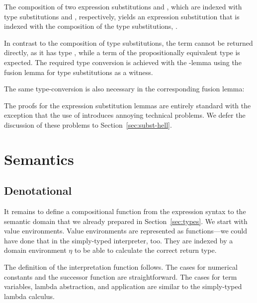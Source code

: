 \documentclass[acmsmall,anonymous,review,screen]{acmart}
\begin{document}

The composition of two expression substitutions  and , which
are indexed with type substitutions  and
, respectively, yields an expression substitution that
is indexed with the composition of the type substitutions,
.
\SubstExamplesECompSS

In contrast to the composition of type substitutions, the term
 cannot be returned directly,
as it has type ,
while a term of the propositionally equivalent type
 is expected.
The required type conversion is achieved with the {\Asubst}-lemma
using the fusion lemma for type substitutions as a witness.

The same type-conversion is also necessary in the corresponding fusion lemma:
\SubstExamplesFusionESubESub

The proofs for the expression substitution lemmas are entirely standard with the
exception that the use of {\Asubst} introduces annoying technical problems.
We defer the discussion of these problems to Section~\ref{sec:subst-hell}.


\section{Semantics}
\label{sec:semantics}

\subsection{Denotational}
\label{sec:denotational}



It remains to define a compositional function from the expression
syntax to the semantic domain that we already prepared in
Section~\ref{sec:types}. We start with value environments.
\TFVEnv
Value environments are represented as functions---we could have done
that in the simply-typed interpreter, too. They are indexed by a
domain environment $\eta$ to be able to calculate the correct return type.

The definition of the interpretation function follows.
\TFExprSem
The cases for numerical constants and the successor function are straightforward.
The cases for term variables, lambda abstraction, and application are
similar to the  simply-typed lambda calculus.
\end{document}

